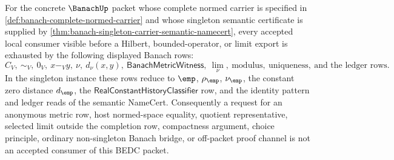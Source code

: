 \begin{lemma}\label{lem:banach-downstream-coverage}
For the concrete $\BanachUp$ packet whose complete normed carrier is specified in
\autoref{def:banach-complete-normed-carrier} and whose singleton semantic
certificate is supplied by
\autoref{thm:banach-singleton-carrier-semantic-namecert}, every accepted local
consumer visible before a Hilbert, bounded-operator, or limit export is
exhausted by the following displayed Banach rows:
$$
C_V,\ \sim_V,\ 0_V,\ x-_V y,\ \nu,\ d_\nu(x,y),\
\mathsf{BanachMetricWitness},\ \lim_\nu,\ \text{modulus},\ \text{uniqueness},\
\text{and the ledger rows}.
$$
In the singleton instance these rows reduce to $\emp$, $\rho_{\emp}$,
$\nu_{\emp}$, the constant zero distance $d_{\emp}$, the
$\mathsf{RealConstantHistoryClassifier}$ row, and the identity pattern and
ledger reads of the semantic NameCert. Consequently a request for an anonymous
metric row, host normed-space equality, quotient representative, selected limit
outside the completion row, compactness argument, choice principle, ordinary
non-singleton Banach bridge, or off-packet proof channel is not an accepted
consumer of this BEDC packet.
\end{lemma}
